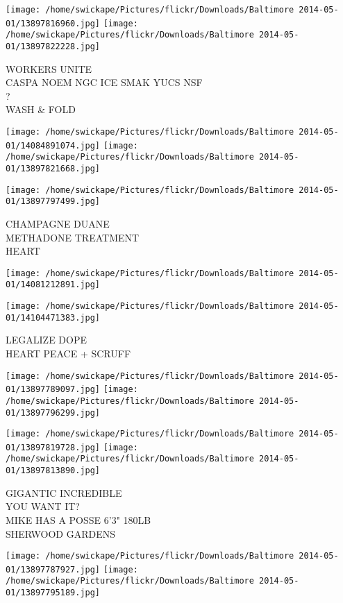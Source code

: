 \documentclass[10pt,letterpaper]{article}
\begin{document}
\texttt{[image: /home/swickape/Pictures/flickr/Downloads/Baltimore 2014-05-01/13897816960.jpg]}
\texttt{[image: /home/swickape/Pictures/flickr/Downloads/Baltimore 2014-05-01/13897822228.jpg]}

WORKERS UNITE\\
CASPA NOEM NGC ICE SMAK YUCS NSF\\
?\\
WASH \& FOLD
\pagebreak

\texttt{[image: /home/swickape/Pictures/flickr/Downloads/Baltimore 2014-05-01/14084891074.jpg]}
\texttt{[image: /home/swickape/Pictures/flickr/Downloads/Baltimore 2014-05-01/13897821668.jpg]}

\vspace{0.25in}
\texttt{[image: /home/swickape/Pictures/flickr/Downloads/Baltimore 2014-05-01/13897797499.jpg]}

CHAMPAGNE DUANE\\
METHADONE TREATMENT\\
HEART
\pagebreak

\texttt{[image: /home/swickape/Pictures/flickr/Downloads/Baltimore 2014-05-01/14081212891.jpg]}

\vspace{0.25in}
\texttt{[image: /home/swickape/Pictures/flickr/Downloads/Baltimore 2014-05-01/14104471383.jpg]}

LEGALIZE DOPE\\
HEART PEACE + SCRUFF
\pagebreak

\texttt{[image: /home/swickape/Pictures/flickr/Downloads/Baltimore 2014-05-01/13897789097.jpg]}
\texttt{[image: /home/swickape/Pictures/flickr/Downloads/Baltimore 2014-05-01/13897796299.jpg]}

\texttt{[image: /home/swickape/Pictures/flickr/Downloads/Baltimore 2014-05-01/13897819728.jpg]}
\texttt{[image: /home/swickape/Pictures/flickr/Downloads/Baltimore 2014-05-01/13897813890.jpg]}

GIGANTIC INCREDIBLE\\
YOU WANT IT?\\
MIKE HAS A POSSE 6'3" 180LB\\
SHERWOOD GARDENS
\pagebreak

\texttt{[image: /home/swickape/Pictures/flickr/Downloads/Baltimore 2014-05-01/13897787927.jpg]}
\texttt{[image: /home/swickape/Pictures/flickr/Downloads/Baltimore 2014-05-01/13897795189.jpg]}
\end{document}
